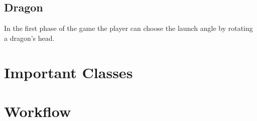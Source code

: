 \documentclass[12pt]{article}
\begin{document}
\subsection{Dragon}

In the first phase of the game the player can choose the launch angle by rotating a dragon's head.

\section{Important Classes}
\label{section:classes}

\section{Workflow}
\label{section:workflow}

\newpage
\lstlistoflistings
\listoffigures
\end{document}
